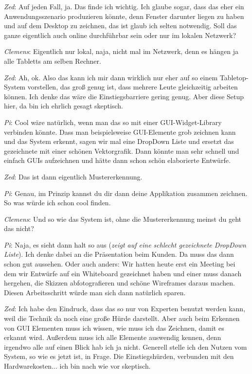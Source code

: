 \medskip \emph{Zed}: Auf jeden Fall, ja. Das finde ich wichtig. Ich glaube sogar, dass das eher ein Anwendungsszenario produzieren könnte, denn Fenster darunter liegen zu haben und auf dem Desktop zu zeichnen, das ist glaub ich selten notwendig. Soll das ganze eigentlich auch online durchführbar sein oder nur im lokalen Netzwerk?

\medskip \emph{Clemens}: Eigentlich nur lokal, naja, nicht mal im Netzwerk, denn es hängen ja alle Tabletts am selben Rechner.

\medskip \emph{Zed}: Ah, ok. Also das kann ich mir dann wirklich nur eher auf so einem Tabletop-System vorstellen, das groß genug ist, dass mehrere Leute gleichzeitig arbeiten können. Ich denke das wäre die Einstiegsbarriere gering genug. Aber diese Setup hier, da bin ich ehrlich gesagt skeptisch.

\medskip \emph{Pi}: Cool wäre natürlich, wenn man das so mit einer GUI-Widget-Library verbinden könnte. Dass man beispielsweise GUI-Elemente grob zeichnen kann und das System erkennt, sagen wir mal eine DropDown Liste und ersetzt das gezeichnete mit einer schönen Vektorgrafik. Dann könnte man sehr schnell und einfach GUIs aufzeichnen und hätte dann schon schön elaborierte Entwürfe.

\medskip \emph{Zed}: Das ist dann eigentlich Mustererkennung.

\medskip \emph{Pi}: Genau, im Prinzip kannst du dir dann deine Applikation zusammen zeichnen. So was würde ich schon cool finden.

\medskip \emph{Clemens}: Und so wie das System ist, ohne die Mustererkennung meinst du geht das nicht?

\medskip \emph{Pi}: Naja, es sieht dann halt so aus (\emph{zeigt auf eine schlecht gezeichnete DropDown Liste}). Ich denke dabei an die Präsentation beim Kunden. Da muss das dann schon gut aussehen. Oder auch anders: Wir hatten heute erst ein Meeting bei dem wir Entwürfe auf ein Whiteboard gezeichnet haben und einer muss danach hergehen, die Skizzen abfotografieren und schöne Wireframes daraus machen. Diesen Arbeitsschritt würde man sich dann natürlich sparen.

\medskip \emph{Zed}: Ich habe den Eindruck, dass das so nur von Experten benutzt werden kann, weil die Technik da noch eine große Hürde darstellt. Aber auch beim Erkennen von GUI Elementen muss ich wissen, wie muss ich das Zeichnen, damit es erkannt wird. Außerdem muss ich alle Elemente auswendig kennen, denn irgendwo alle auf einen Blick hab ich ja nicht. Generell stelle ich den Nutzen vom System, so wie es jetzt ist, in Frage. Die Einstiegshürden, verbunden mit den Hardwarekosten... ich bin nach wie vor skeptisch.

